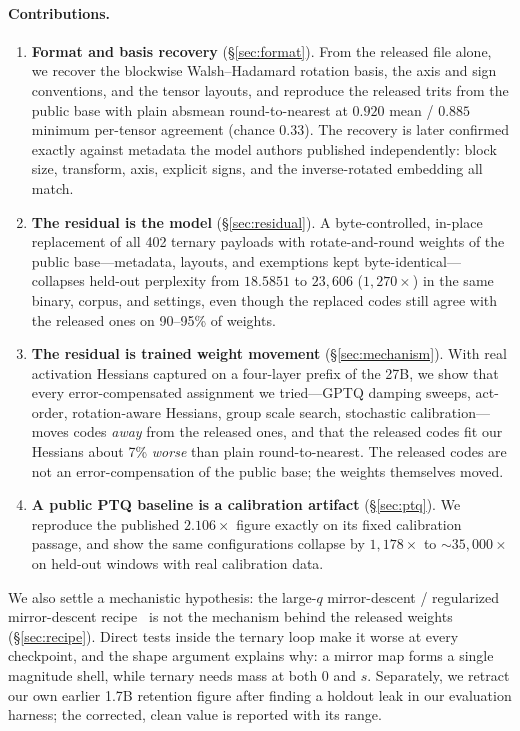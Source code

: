 \paragraph{Contributions.}
\begin{enumerate}
  \item \textbf{Format and basis recovery} (\S\ref{sec:format}). From the
  released file alone, we recover the blockwise Walsh--Hadamard rotation basis,
  the axis and sign conventions, and the tensor layouts, and reproduce the
  released trits from the public base with plain absmean round-to-nearest at
  $0.920$ mean / $0.885$ minimum per-tensor agreement (chance $0.33$). The
  recovery is later confirmed exactly against metadata the model authors
  published independently: block size, transform, axis, explicit signs, and
  the inverse-rotated embedding all match.
  \item \textbf{The residual is the model} (\S\ref{sec:residual}). A
  byte-controlled, in-place replacement of all 402 ternary payloads with
  rotate-and-round weights of the public base---metadata, layouts, and
  exemptions kept byte-identical---collapses held-out perplexity from
  $18.5851$ to $23{,}606$ ($1{,}270\times$) in the same binary, corpus, and
  settings, even though the replaced codes still agree with the released ones
  on 90--95\% of weights.
  \item \textbf{The residual is trained weight movement} (\S\ref{sec:mechanism}).
  With real activation Hessians captured on a four-layer prefix of the 27B, we
  show that every error-compensated assignment we tried---GPTQ damping sweeps,
  act-order, rotation-aware Hessians, group scale search, stochastic
  calibration---moves codes \emph{away} from the released ones, and that the
  released codes fit our Hessians about 7\% \emph{worse} than plain
  round-to-nearest. The released codes are not an error-compensation of the
  public base; the weights themselves moved.
  \item \textbf{A public PTQ baseline is a calibration artifact}
  (\S\ref{sec:ptq}). We reproduce the published $2.106\times$ figure exactly on
  its fixed calibration passage, and show the same configurations collapse by
  $1{,}178\times$ to $\sim$$35{,}000\times$ on held-out windows with real
  calibration data.
\end{enumerate}

We also settle a mechanistic hypothesis: the large-$q$ mirror-descent /
regularized mirror-descent recipe~\citep{rmd,rmd2,proximalmf} is not the
mechanism behind the released weights (\S\ref{sec:recipe}). Direct tests inside
the ternary loop make it worse at every checkpoint, and the shape argument
explains why: a mirror map forms a single magnitude shell, while ternary needs
mass at both $0$ and $s$. Separately, we retract our own earlier 1.7B retention
figure after finding a holdout leak in our evaluation harness; the corrected,
clean value is reported with its range.

